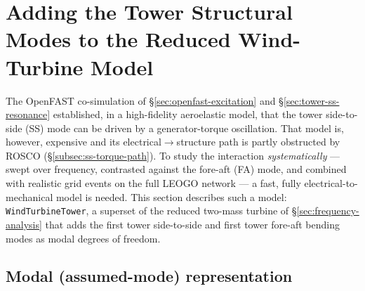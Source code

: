
\section{Adding the Tower Structural Modes to the Reduced Wind-Turbine Model}
\label{sec:simplified-tower-model}

The OpenFAST co-simulation of \S\ref{sec:openfast-excitation} and
\S\ref{sec:tower-ss-resonance} established, in a high-fidelity aeroelastic model,
that the tower side-to-side (SS) mode can be driven by a generator-torque
oscillation. That model is, however, expensive and its electrical$\to$structure
path is partly obstructed by ROSCO (\S\ref{subsec:ss-torque-path}). To study the
interaction \emph{systematically} --- swept over frequency, contrasted against
the fore-aft (FA) mode, and combined with realistic grid events on the full
LEOGO network --- a fast, fully electrical-to-mechanical model is needed. This
section describes such a model: \texttt{WindTurbineTower}, a superset of the
reduced two-mass turbine of \S\ref{sec:frequency-analysis} that adds the first
tower side-to-side and first tower fore-aft bending modes as modal degrees of
freedom.

\subsection{Modal (assumed-mode) representation}
\label{subsec:stm-modal}

